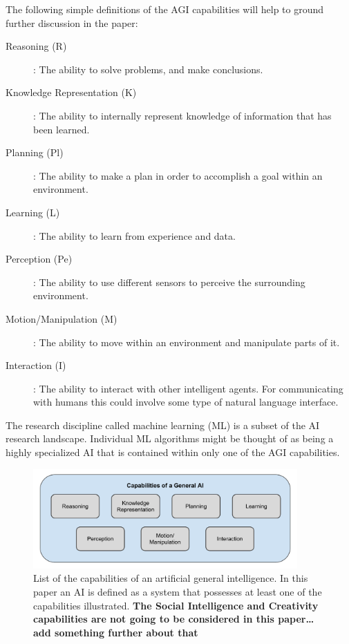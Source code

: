     The following simple definitions of the AGI capabilities will help to ground further discussion in the paper:

    \begin{description}
        \item [Reasoning (R)]: The ability to solve problems, and make conclusions.
        \item [Knowledge Representation (K)]: The ability to internally represent knowledge of information that has been learned.
        \item [Planning (Pl)]: The ability to make a plan in order to accomplish a goal within an environment.
        \item [Learning (L)]: The ability to learn from experience and data.
        \item [Perception (Pe)]: The ability to use different sensors to perceive the surrounding environment.
        \item [Motion/Manipulation (M)]: The ability to move within an environment and manipulate parts of it.
        \item [Interaction (I)]: The ability to interact with other intelligent agents. For communicating with humans this could involve some type of natural language interface.
    \end{description}

    The research discipline called machine learning (ML) is a subset of the AI research landscape. Individual ML algorithms might be thought of as being a highly specialized AI that is contained within only one of the AGI capabilities.

	\begin{figure}[htbp]
    	\centering
     	\includegraphics[width=0.9\textwidth]{Figures/AI_capabilities}
    	\caption{List of the capabilities of an artificial general intelligence. In this paper an AI is defined as a system that possesses at least one of the capabilities illustrated. \textbf{The Social Intelligence and Creativity capabilities are not going to be considered in this paper\ldots add something further about that}}
        \label{fig:AIcapabilities}
    \end{figure}


